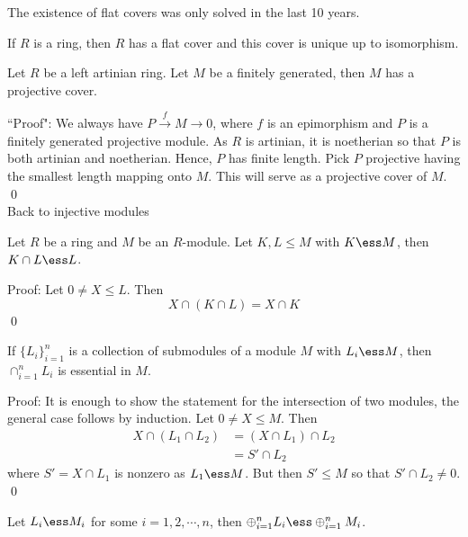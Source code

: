 The existence of flat covers was only solved in the last 10 years. 

\begin{thm}
If $R$ is a ring, then $R$ has a flat cover and this cover is unique up to isomorphism. 
\end{thm}

\begin{thm}
Let $R$ be a left artinian ring. Let $M$ be a finitely generated, then $M$ has a projective cover. 
\end{thm}

``Proof": We always have $P \stackrel{f}{\rightarrow} M \rightarrow 0$, where $f$ is an epimorphism and $P$ is a finitely generated projective module. As $R$ is artinian, it is noetherian so that $P$ is both artinian and noetherian. Hence, $P$ has finite length. Pick $P$ projective having the smallest length mapping onto $M$. This will serve as a projective cover of $M$. \qed \\




Back to injective modules \\

\begin{lem}
Let $R$ be a ring and $M$ be an $R$-module. Let $K,L \leq M$ with $K \ess M$, then $K \cap L \ess L$.
\end{lem}

Proof: Let $0 \neq X \leq L$. Then
\[
X \cap (K \cap L)=X \cap K
\]
\qed \\

\begin{lem}
If $\{L_i\}_{i=1}^n$ is a collection of submodules of a module $M$ with $L_i \ess M$, then $\cap_{i=1}^n L_i$ is essential in $M$.
\end{lem}

Proof: It is enough to show the statement for the intersection of two modules, the general case follows by induction. Let $0 \neq X \leq M$. Then
\[
\begin{split}
X \cap (L_1 \cap L_2)&= (X\cap L_1) \cap L_2 \\
&=S' \cap L_2
\end{split}
\]
where $S'=X \cap L_1$ is nonzero as $L_1 \ess M$. But then $S' \leq M$ so that $S' \cap L_2 \neq 0$. \qed \\


\begin{lem}
Let $L_i \ess M_i$ for some $i=1,2,\cdots,n$, then $\oplus_{i=1}^n L_i \ess \oplus_{i=1}^n M_i$.
\end{lem}

